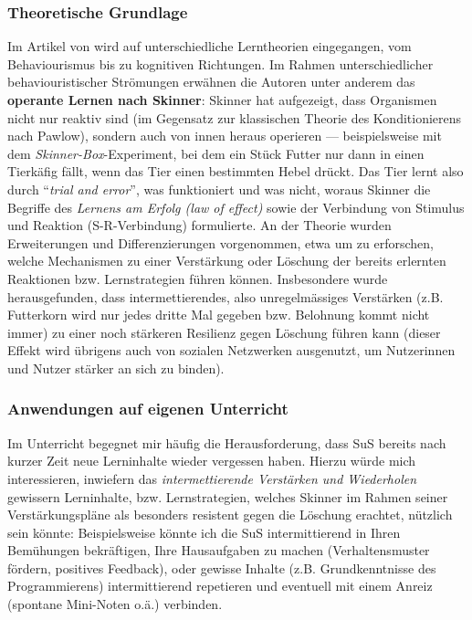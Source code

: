 \begin{myExBox}[title=Intermettierendes Verstärken von gewünschtem Lern-Verhalten]
\subsubsection*{Theoretische Grundlage}
Im Artikel von \textcite{alma99117228235505511} wird auf unterschiedliche Lerntheorien eingegangen, vom Behaviourismus bis zu kognitiven Richtungen. Im Rahmen unterschiedlicher behaviouristischer Strömungen erwähnen die Autoren unter anderem 
das \textbf{operante Lernen nach Skinner}: Skinner hat aufgezeigt, dass Organismen nicht nur reaktiv sind (im Gegensatz zur klassischen Theorie des Konditionierens nach Pawlow), sondern auch von innen heraus operieren --- beispielsweise mit dem \textit{Skinner-Box}-Experiment, bei dem ein Stück Futter nur dann in einen Tierkäfig fällt, wenn das Tier einen bestimmten Hebel drückt. Das Tier lernt also durch ``\textit{trial and error}'', was funktioniert und was nicht, woraus Skinner die Begriffe des \textit{Lernens am Erfolg (law of effect)} sowie der Verbindung von Stimulus und Reaktion (S-R-Verbindung) formulierte.
An der Theorie wurden Erweiterungen und Differenzierungen vorgenommen, etwa um zu erforschen, welche Mechanismen zu einer Verstärkung oder Löschung der bereits erlernten Reaktionen bzw. Lernstrategien führen können. Insbesondere wurde herausgefunden, dass intermettierendes, also unregelmässiges Verstärken (z.B. Futterkorn wird nur jedes dritte Mal gegeben bzw. Belohnung kommt nicht immer) zu einer noch stärkeren Resilienz gegen Löschung führen kann (dieser Effekt wird übrigens auch von sozialen Netzwerken ausgenutzt, um Nutzerinnen und Nutzer stärker an sich zu binden).

\subsubsection*{Anwendungen auf eigenen Unterricht}
Im Unterricht begegnet mir häufig die Herausforderung, dass SuS bereits nach kurzer Zeit neue Lerninhalte wieder vergessen haben. Hierzu würde mich interessieren, inwiefern das \textit{intermettierende Verstärken und Wiederholen} gewissern Lerninhalte, bzw. Lernstrategien, welches Skinner im Rahmen seiner Verstärkungspläne als besonders resistent gegen die Löschung erachtet, nützlich sein könnte: Beispielsweise könnte ich die SuS intermittierend in Ihren Bemühungen bekräftigen, Ihre Hausaufgaben zu machen (Verhaltensmuster fördern, positives Feedback), oder gewisse Inhalte (z.B. Grundkenntnisse des Programmierens) intermittierend repetieren und eventuell mit einem Anreiz (spontane Mini-Noten o.ä.) verbinden.
\end{myExBox}

